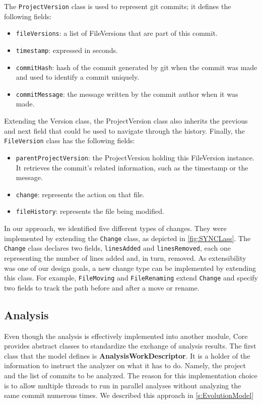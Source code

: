 The \texttt{ProjectVersion} class is used to represent git commits; it defines the following fields: 
\begin{itemize}
    \item \texttt{fileVersions}: a list of FileVersions that are part of this commit.
    \item \texttt{timestamp}: expressed in seconds. 
    \item \texttt{commitHash}: hash of the commit generated by git when the commit was made and used to identify a commit uniquely. 
    \item \texttt{commitMessage}: the message written by the commit author when it was made. 
\end{itemize}
Extending the Version class, the ProjectVersion class also inherits the previous and next field that could be used to navigate through the history. 
Finally, the \texttt{FileVersion} class has the following fields:
\begin{itemize}
    \item \texttt{parentProjectVersion}: the ProjectVersion holding this FileVersion instance. It retrieves the commit's related information, such as the timestamp or the message. 
    \item \texttt{change}: represents the action on that file. 
    \item \texttt{fileHistory}: represents the file being modified. 
\end{itemize}

In our approach, we identified five different types of changes. They were implemented by extending the \texttt{Change} class, as depicted in \autoref{fig:SYNCLass}. The \texttt{Change} class declares two fields, \texttt{linesAdded} and \texttt{linesRemoved}, each one representing the number of lines added and, in turn, removed. 
As extensibility was one of our design goals, a new change type can be implemented by extending this class.
For example, \texttt{FileMoving} and \texttt{FileRenaming} extend \texttt{Change} and specify two fields to track the path before and after a move or rename.



\subsection*{Analysis}
Even though the analysis is effectively implemented into another module, Core provides abstract classes to standardize the exchange of analysis results. 
The first class that the model defines is \textbf{AnalysisWorkDescriptor}.
It is a holder of the information to instruct the analyzer on what it has to do. Namely, the project and the list of commits to be analyzed.
The reason for this implementation choice is to allow multiple threads to run in parallel analyses without analyzing the same commit numerous times. 
We described this approach in \autoref{s:EvolutionModel}


